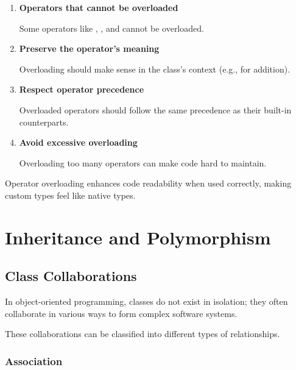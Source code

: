 \begin{tipsblock}
    \begin{enumerate}

        \item \textbf{Operators that cannot be overloaded}
        
        Some operators like \plaintt{::}, , and  cannot be overloaded.
        
        \item \textbf{Preserve the operator's meaning}
        
        Overloading should make sense in the class's context (e.g., \plaintt{+} for addition).
        
        \item \textbf{Respect operator precedence}
        
        Overloaded operators should follow the same precedence as their built-in counterparts.
        
        \item \textbf{Avoid excessive overloading}
        
        Overloading too many operators can make code hard to maintain.

    \end{enumerate}
\end{tipsblock}

Operator overloading enhances code readability when used correctly, making custom types feel like native types.

\newpage

\section{Inheritance and Polymorphism}

\subsection{Class Collaborations}

In object-oriented programming, classes do not exist in isolation; they often collaborate in various ways to form complex software systems.

\vspace{0.8em}

These collaborations can be classified into different types of relationships.

\subsubsection{Association}


